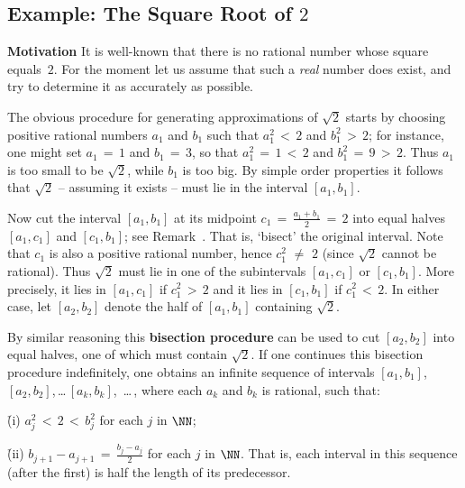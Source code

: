 \V

        \subsection{\small{{\bf Example}:} The Square Root of $2$}
        \label{ExampB25.90}

\V
        {\bf Motivation} It is well-known that there is no rational number whose square equals~$2$.
    For the moment let us assume that such a {\em real} number does exist, and try to determine it as accurately as possible.

        The obvious procedure for generating approximations of $\sqrt{2}$ starts by choosing positive rational numbers $a_{1}$ and $b_{1}$ such that $a_{1}^{2}\,<\,2$ and $b_{1}^{2}\,>\,2$;
    for instance, one might set $a_{1} \,=\, 1$ and $b_{1} \,=\, 3$, so that $a_{1}^{2} \,=\, 1\,<\,2$ and $b_{1}^{2} \,=\, 9\,>\,2$.
   Thus $a_{1}$ is too small to be $\sqrt{2}$, while $b_{1}$ is too big.
    By simple order properties it follows that $\sqrt{2}$ -- assuming it exists -- must lie in the interval $[a_{1},b_{1}]$.

        Now cut the interval $[a_{1},b_{1}]$ at its midpoint $c_{1} \,=\, {\displaystyle \frac{a_{1}+b_{1}}{2} \,=\, 2}$
    into equal halves $[a_{1},c_{1}]$ and $[c_{1},b_{1}]$; see Remark~. That is, `bisect' the original interval.
    Note that $c_{1}$ is also a positive rational number, hence $c_{1}^{2} \,\,{\neq}\,\, 2$ (since $\sqrt{2}$ cannot be rational).
    Thus $\sqrt{2}$ must lie in one of the subintervals $[a_{1},c_{1}]$ or $[c_{1},b_{1}]$.
    More precisely, it lies in $[a_{1},c_{1}]$ if $c_{1}^{2}\,>\,2$ and it lies in $[c_{1},b_{1}]$ if $c_{1}^{2}\,<\,2$.
    In either case, let $[a_{2},b_{2}]$ denote the half of $[a_{1},b_{1}]$ containing $\sqrt{2}$.

        By similar reasoning this {\bf bisection procedure} can be used to cut $[a_{2},b_{2}]$ into equal halves, one of which must contain $\sqrt{2}$.
    If one continues this bisection procedure indefinitely, one obtains an infinite sequence of intervals $[a_{1},b_{1}]$, $[a_{2},b_{2}]$,\,{\ldots}\,$[a_{k},b_{k}]$, \,{\ldots}\,, where each $a_{k}$ and $b_{k}$ is rational, such that:

\VA

        \h (i) $a_{j}^{2}\,<\,2\,<\,b_{j}^{2}$ for each $j$ in ${\NN}$;

        \h (ii) ${\displaystyle b_{j+1}-a_{j+1} \,=\,\frac{b_{j}-a_{j}}{2}}$ for each $j$ in ${\NN}$.
    That is, each interval in this sequence (after the first) is half the length of its predecessor.

